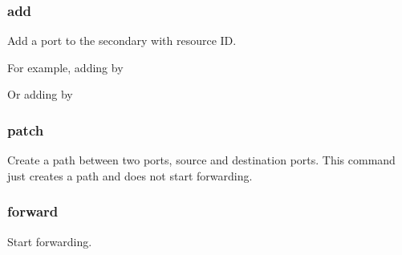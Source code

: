 \documentclass[a4paper,11pt,openany,oneside,english]{sphinxmanual}
\begin{document}
\subsubsection{add}
\label{\detokenize{commands/secondary/spp_nfv:add}}\label{\detokenize{commands/secondary/spp_nfv:commands-spp-nfv-add}}
Add a port to the secondary with resource ID.

For example, adding  by

\begin{sphinxVerbatim}[commandchars=\\\{\},formatcom=\footnotesize]
\end{sphinxVerbatim}

Or adding  by

\begin{sphinxVerbatim}[commandchars=\\\{\},formatcom=\footnotesize]
\end{sphinxVerbatim}


\subsubsection{patch}
\label{\detokenize{commands/secondary/spp_nfv:patch}}\label{\detokenize{commands/secondary/spp_nfv:commands-spp-nfv-patch}}
Create a path between two ports, source and destination ports.
This command just creates a path and does not start forwarding.

\begin{sphinxVerbatim}[commandchars=\\\{\},formatcom=\footnotesize]
\end{sphinxVerbatim}


\subsubsection{forward}
\label{\detokenize{commands/secondary/spp_nfv:forward}}\label{\detokenize{commands/secondary/spp_nfv:commands-spp-nfv-forward}}
Start forwarding.

\begin{sphinxVerbatim}[commandchars=\\\{\},formatcom=\footnotesize]
\end{sphinxVerbatim}
\end{document}
